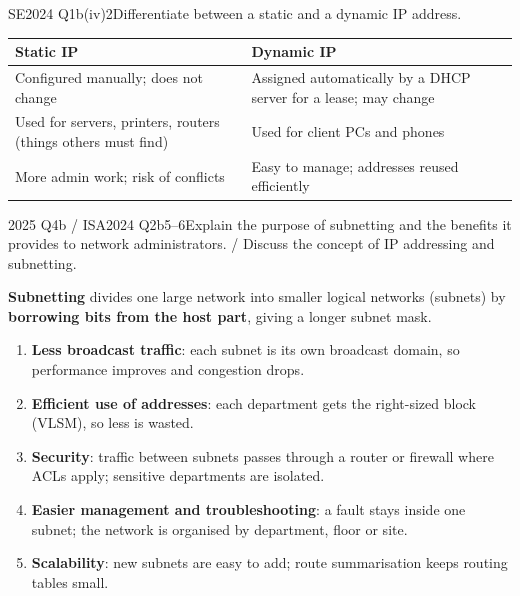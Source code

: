 \documentclass[10pt]{article}
\begin{document}
\begin{pastq}{SE2024 Q1b(iv)}{2}Differentiate between a static and a dynamic IP address.\end{pastq}
\begin{ans}
\begin{tabularx}{\linewidth}{@{}XX@{}}
\toprule
\textbf{Static IP} & \textbf{Dynamic IP}\\\midrule
Configured manually; does not change & Assigned automatically by a DHCP server for a lease; may change\\
Used for servers, printers, routers (things others must find) & Used for client PCs and phones\\
More admin work; risk of conflicts & Easy to manage; addresses reused efficiently\\
\bottomrule
\end{tabularx}
\end{ans}

\begin{pastq}{2025 Q4b \textnormal{/} ISA2024 Q2b}{5--6}Explain the purpose of subnetting and the benefits it provides to network administrators. / Discuss the concept of IP addressing and subnetting.\end{pastq}
\begin{ans}
\textbf{Subnetting} divides one large network into smaller logical networks (subnets) by \textbf{borrowing bits from the host part}, giving a longer subnet mask.
\begin{enumerate}
\item \textbf{Less broadcast traffic}: each subnet is its own broadcast domain, so performance improves and congestion drops.
\item \textbf{Efficient use of addresses}: each department gets the right-sized block (VLSM), so less is wasted.
\item \textbf{Security}: traffic between subnets passes through a router or firewall where ACLs apply; sensitive departments are isolated.
\item \textbf{Easier management and troubleshooting}: a fault stays inside one subnet; the network is organised by department, floor or site.
\item \textbf{Scalability}: new subnets are easy to add; route summarisation keeps routing tables small.
\end{enumerate}
\end{ans}
\end{document}
